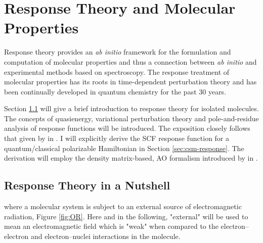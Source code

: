 \chapter{Response Theory and Molecular Properties}\label{ch:molprop}

Response theory provides an \emph{ab initio} framework for the
formulation and computation of molecular properties and thus a
connection
between \emph{ab initio} and experimental methods based on spectroscopy.
The response treatment of molecular properties has its roots in
time-dependent perturbation theory\autocite{Konishi2009-zb} and has been
continually developed in quantum chemistry for the past 30
years.\autocite{Olsen1985-nr, Helgaker1992-ph, Olsen1995-pf,
Christiansen1998-pe, Norman2011-ad, Helgaker2012-cz, Pawlowski2015-sq}

Section \ref{sec:exact-response} will give a brief introduction to
response theory for isolated molecules.
The concepts of quasienergy,\autocite{Christiansen1998-pe} variational
perturbation theory\autocite{Helgaker1992-ph} and pole-and-residue
analysis of response functions\autocite{Olsen1985-nr} will be
introduced. The exposition closely follows that given by
\citeauthor{Saue2002-ns} in .
I will explicitly derive the \acrshort{SCF} response function for a
quantum/classical polarizable Hamiltonian in Section
\ref{sec:csm-response}. The derivation will employ the
density matrix-based, \acrshort{AO} formalism introduced by
\citeauthor{Thorvaldsen2008-sg} in .

\section{Response Theory in a Nutshell}\label{sec:exact-response}

 where a molecular
system is subject to an external source of electromagnetic radiation,
Figure \ref{fig:OR}.
Here and in the following, "external" will be used to mean an
electromagnetic field which is "weak" when compared to the
electron--electron and electron--nuclei interactions in the molecule.

